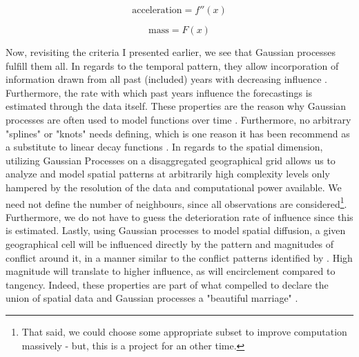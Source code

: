 \documentclass[a4paper]{article}
\begin{document}
\[
\text{acceleration} = f''(x) \tag{12}  \label{eq:acc}
\]

\[
\text{mass} = F(x) \tag{13}  \label{eq:mass}
\]


Now, revisiting the criteria I presented earlier, we see that Gaussian processes fulfill them all. In regards to the temporal pattern, they allow incorporation of information drawn from all past (included) years with decreasing influence \citep[410-419]{Mcelreath_2018}. Furthermore, the rate with which past years influence the forecastings is estimated through the data itself. These properties are the reason why Gaussian processes are often used to model functions over time \citep[13]{williams2006gaussian}. Furthermore, no arbitrary "splines" or "knots" needs defining, which is one reason it has been recommend as a substitute to linear decay functions \cite[501]{Gelman_2013}. In regards to the spatial dimension, utilizing Gaussian Processes on a disaggregated geographical grid allows us to analyze and model spatial patterns at arbitrarily high complexity levels only hampered by the resolution of the data and computational power available. We need not define the number of neighbours, since all observations are considered\footnote{That said, we could choose some appropriate subset to improve computation massively \citep{gelfand2016spatial} - but, this is a project for an other time.}. Furthermore, we do not have to guess the deterioration rate of influence since this is estimated. Lastly, using Gaussian processes to model spatial diffusion, a given geographical cell will be influenced directly by the pattern and magnitudes of conflict around it, in a manner similar to the conflict patterns identified by \cite{schutte2011diffusion}. High magnitude will translate to higher influence, as will encirclement compared to tangency. Indeed, these properties are part of what compelled \cite{gelfand2016spatial} to declare the union of spatial data and Gaussian processes a "beautiful marriage" \citep[86]{gelfand2016spatial}.
\end{document}
